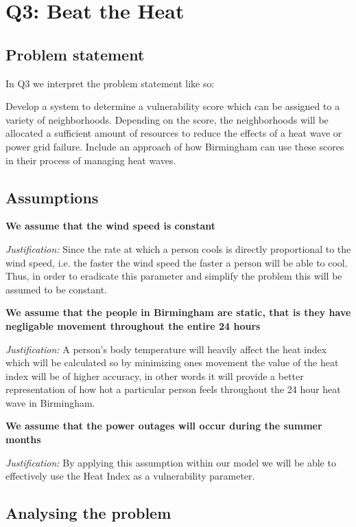 \documentclass[11pt]{article}
\begin{document}
\section{Q3: Beat the Heat}
\subsection{Problem statement}

In Q3 we interpret the problem statement like so:

Develop a system to determine a vulnerability score which can be assigned to a  variety of neighborhoods. Depending on the score, the neighborhoods will be allocated a sufficient amount of resources to reduce the effects of a heat wave or power grid failure. Include an approach of how Birmingham can use these scores in their process of managing heat waves.

\subsection{Assumptions}
\textbf{\sffamily We assume that the wind speed is constant}

\textit{Justification:} Since the rate at which a person cools is directly proportional to the wind speed, i.e. the faster the wind speed the faster a person will be able to cool. Thus, in order to eradicate this parameter and simplify the problem this will be assumed to be constant.

\noindent
\textbf{\sffamily We assume that the people in Birmingham are static, that is they have negligable movement throughout the entire 24 hours}

\textit{Justification:} A person's body temperature will heavily affect the heat index which will be calculated so by minimizing ones movement the value of the heat index will be of higher accuracy, in other words it will provide a better representation of how hot a particular person feels throughout the 24 hour heat wave in Birmingham.

\noindent
\textbf{\sffamily We assume that the power outages will occur during the summer months}

\textit{Justification:} By applying this assumption within our model we will be able to effectively use the Heat Index as a vulnerability parameter.

\subsection{Analysing the problem}
\end{document}
